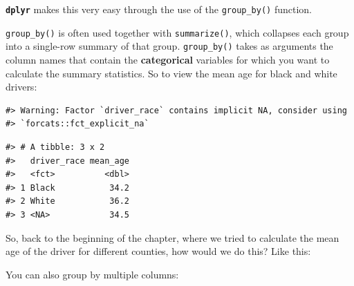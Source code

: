 \documentclass[]{book}
\newenvironment{Shaded}{\begin{snugshade}}{\end{snugshade}}
\newcommand{\DataTypeTok}[1]{\textcolor[rgb]{0.13,0.29,0.53}{#1}}
\newcommand{\KeywordTok}[1]{\textcolor[rgb]{0.13,0.29,0.53}{\textbf{#1}}}
\newcommand{\NormalTok}[1]{#1}
\newcommand{\OperatorTok}[1]{\textcolor[rgb]{0.81,0.36,0.00}{\textbf{#1}}}
\newcommand{\OtherTok}[1]{\textcolor[rgb]{0.56,0.35,0.01}{#1}}
\newcommand{\StringTok}[1]{\textcolor[rgb]{0.31,0.60,0.02}{#1}}
\begin{document}
\textbf{\texttt{dplyr}} makes this very easy through the use of the
\texttt{group\_by()} function.

\texttt{group\_by()} is often used together with \texttt{summarize()}, which collapses each
group into a single-row summary of that group. \texttt{group\_by()} takes as arguments
the column names that contain the \textbf{categorical} variables for which you want
to calculate the summary statistics. So to view the mean age for black and white drivers:

\begin{Shaded}
\end{Shaded}

\begin{verbatim}
#> Warning: Factor `driver_race` contains implicit NA, consider using
#> `forcats::fct_explicit_na`
\end{verbatim}

\begin{verbatim}
#> # A tibble: 3 x 2
#>   driver_race mean_age
#>   <fct>          <dbl>
#> 1 Black           34.2
#> 2 White           36.2
#> 3 <NA>            34.5
\end{verbatim}

So, back to the beginning of the chapter, where we tried to calculate the mean age of the driver for different counties, how would we do this? Like this:

\begin{Shaded}
\end{Shaded}

You can also group by multiple columns:

\begin{Shaded}
\end{Shaded}
\end{document}
